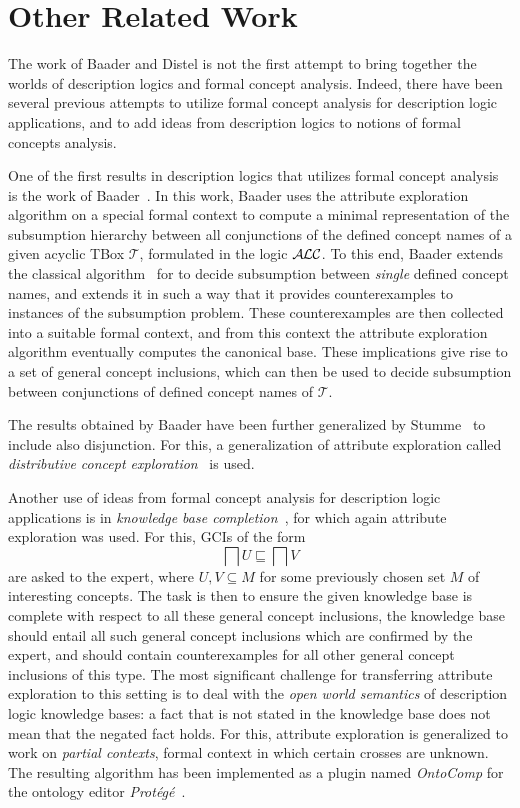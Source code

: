 \section{Other Related Work}
\label{sec:related-work}

The work of Baader and Distel is not the first attempt to bring together the worlds of
description logics and formal concept analysis.  Indeed, there have been several previous
attempts to utilize formal concept analysis for description logic applications, and to add
ideas from description logics to notions of formal concepts analysis.

One of the first results in description logics that utilizes formal concept analysis is
the work of Baader~\cite{Baader-KRUSE-95}.  In this work, Baader uses the attribute
exploration algorithm on a special formal context to compute a minimal representation of
the subsumption hierarchy between all conjunctions of the defined concept names of a given
acyclic TBox $\mathcal{T}$, formulated in the logic $\mathcal{A}\kern-0.05em\mathcal{L}\mathcal{C}$.  To this end, Baader extends
the classical algorithm~\cite{journals/ai/Schmidt-SchaussS91} for \ALC to decide
subsumption between \emph{single} defined concept names, and extends it in such a way that
it provides counterexamples to instances of the subsumption problem.  These
counterexamples are then collected into a suitable formal context, and from this context
the attribute exploration algorithm eventually computes the canonical base.  These
implications give rise to a set of general concept inclusions, which can then be used to
decide subsumption between conjunctions of defined concept names of $\mathcal{T}$.

The results obtained by Baader have been further generalized by
Stumme~\cite{stumme96concept} to include also disjunction.  For this, a generalization of
attribute exploration called \emph{distributive concept
  exploration}~\cite{conf/ki/Stumme98} is used.

Another use of ideas from formal concept analysis for description logic applications is in
\emph{knowledge base completion}~\cite{Sert07,BGSS07}, for which again attribute
exploration was used.  For this, GCIs of the form
\begin{equation*}
  \bigsqcap U \sqsubseteq \bigsqcap V
\end{equation*}
are asked to the expert, where $U, V \subseteq M$ for some previously chosen set $M$ of
interesting concepts.  The task is then to ensure the given knowledge base is complete
with respect to all these general concept inclusions, \ie the knowledge base should entail
all such general concept inclusions which are confirmed by the expert, and should contain
counterexamples for all other general concept inclusions of this type.  The most
significant challenge for transferring attribute exploration to this setting is to deal
with the \emph{open world semantics} of description logic knowledge bases: a fact that is
not stated in the knowledge base does not mean that the negated fact holds.  For this,
attribute exploration is generalized to work on \emph{partial contexts}, \ie formal
context in which certain crosses are unknown.  The resulting algorithm has been
implemented as a plugin named \emph{OntoComp} for the ontology editor
\emph{Protégé}~\cite{Sert09b}.

